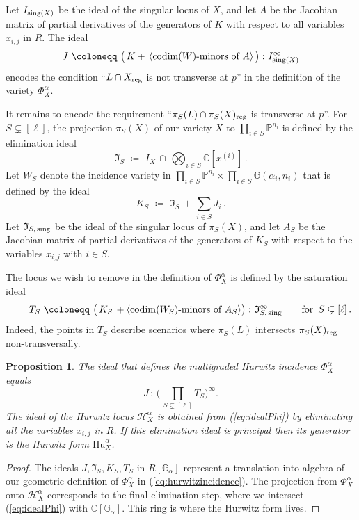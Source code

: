 \documentclass[12pt]{article}
\newtheorem{proposition}[theorem]{Proposition}
\theoremstyle{definition}
\newcommand{\bC}{\mathbb C}
\newcommand{\bG}{\mathbb G}
\newcommand{\bP}{\mathbb P}
\newcommand{\cH}{\mathcal H}
\newcommand{\codim}{{\rm codim}}
\begin{document}
Let $I_{{\rm sing}(X)}$ be the ideal of the singular locus of $X$, and let $A$ be the Jacobian matrix of partial derivatives of the generators of $K$ with respect to all variables $x_{i,j}$ in $R$.
  The ideal
\[
    J \,\,\coloneqq \,\,\bigl(\,K + \,\langle\text{$\codim(W)$-minors of $A$}\rangle \,\bigr)\,\colon I_{{\rm sing}(X)}^\infty
\]
encodes the condition ``$L\cap X_{\rm reg}$ is not transverse at $p$'' in the definition of the variety $\Phi^\alpha_X$.

It remains to encode the requirement  ``$\pi_S(L)\cap\pi_S(X)_{\rm reg}$ is transverse at $p$''.
For $S\subsetneq [\ell]$, the projection $\pi_S(X)$ of our variety $X$ to $\prod_{i\in S}\bP^{n_i}$ is defined by the elimination ideal
\[ \mathfrak{I}_S \,\,\coloneqq \,\,I_X \,\cap\,\bigotimes_{i\in S}\bC[x^{(i)}]\,. \]
Let $W_S$ denote the incidence variety in $\prod_{i\in S}\bP^{n_i} \times \prod_{i\in S}\bG(\alpha_i, n_i)$
that is defined by the ideal
\[
    K_S\,\,\coloneqq \,\,\mathfrak{I}_S \,+\, \sum_{i\in S} J_i\,.
\]
Let $\mathfrak{I}_{S,\,{\rm sing}}$ be the ideal of the singular locus of $\pi_S(X)$,
and let $A_S$ be the Jacobian matrix of partial derivatives of the generators of $K_S$ with respect to 
the variables $x_{i,j}$ with $i\in S$.

The locus we wish to remove in the definition of $\Phi^\alpha_X$ is defined by the saturation ideal
\[
\qquad
    T_S\,\, \coloneqq \,\, \bigl(\,K_S \,+ \langle\text{$\codim(W_S)$-minors of $A_S$}\rangle\bigr)\,
    \colon \mathfrak{I}_{S,\,{\rm sing}}^\infty
\qquad {\rm for} \,\,\, S \subsetneq [\ell]\,.
\]
Indeed, the points in $T_S$ describe scenarios where
$\pi_S(L)$ intersects $\pi_S(X)_{\rm reg}$ non-transversally. 

\begin{proposition}\label{prop:ideal of multigraded Hurwitz}
The ideal that defines the multigraded Hurwitz incidence $\Phi^\alpha_X$ equals
\begin{equation}\label{eq:idealPhi}
    J\,\colon\,\biggl(\,\prod_{S\subsetneq [\ell]}T_S \biggr)^{\! \infty}.
\end{equation}
The ideal of the Hurwitz locus  $\cH_X^\alpha$ 
is obtained from (\ref{eq:idealPhi})
by eliminating all the variables $x_{i,j}$ in $R$.
If this elimination ideal is principal then its generator is the Hurwitz form
$\mathrm{Hu}^\alpha_X$.
\end{proposition}

\begin{proof}
The ideals $J,\mathfrak{I}_S,K_S,T_S$  in $R[\bG_\alpha]$
represent a translation into algebra of our geometric definition of
$\Phi^\alpha_X$ in (\ref{eq:hurwitzincidence}). The projection from $\Phi^\alpha_X$ onto $\cH_X^\alpha$ 
corresponds to the final elimination step, where we intersect (\ref{eq:idealPhi})
with $\bC[ \bG_\alpha]$. This ring is where the Hurwitz form lives.
\end{proof}
\end{document}
